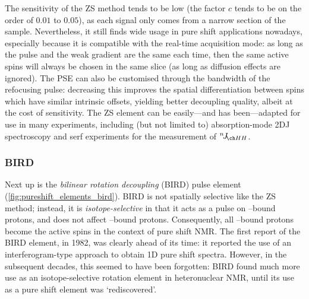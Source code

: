 The sensitivity of the ZS method tends to be low (the factor $c$ tends to be on the order of $0.01$ to $0.05$), as each signal only comes from a narrow section of the sample.
Nevertheless, it still finds wide usage in pure shift applications nowadays, especially because it is compatible with the real-time acquisition mode\autocite{Meyer2013ACIE}: as long as the pulse and the weak gradient are the same each time, then the same active spins will always be chosen in the same slice (as long as diffusion effects are ignored).
The PSE can also be customised through the bandwidth of the refocusing pulse: decreasing this improves the spatial differentiation between spins which have similar intrinsic offsets, yielding better decoupling quality, albeit at the cost of sensitivity.
The ZS element can be easily---and has been---adapted for use in many experiments, including (but not limited to) absorption-mode 2DJ spectroscopy\autocite{Pell2007JMR} and \acf{serf} experiments for the measurement of $\nJ{HH}$\autocite{Giraud2010ACIE,Gubensak2014CC,Mishra2017JMR,Buchberger2018MRC}.


\subsubsection{BIRD}

Next up is the \textit{bilinear rotation decoupling} (BIRD) pulse element (\cref{fig:pureshift_elements_bird}).
BIRD is not spatially selective like the ZS method; instead, it is \textit{isotope-selective} in that it acts as a  pulse on \carbon{}--bound protons, and does not affect \carbont{}--bound protons.
Consequently, all \carbon{}--bound protons become the active spins in the context of pure shift NMR.
The first report of the BIRD element\autocite{Garbow1982CPL}, in 1982, was clearly ahead of its time: it reported the use of an interferogram-type approach to obtain 1D pure shift spectra.
However, in the subsequent decades, this seemed to have been forgotten: BIRD found much more use as an isotope-selective rotation element in heteronuclear NMR\autocite{Uhrin1993JMRSA}, until its use as a pure shift element was `rediscovered'\autocite{Sakhaii2009JMR,Aguilar2011ACIE}.

